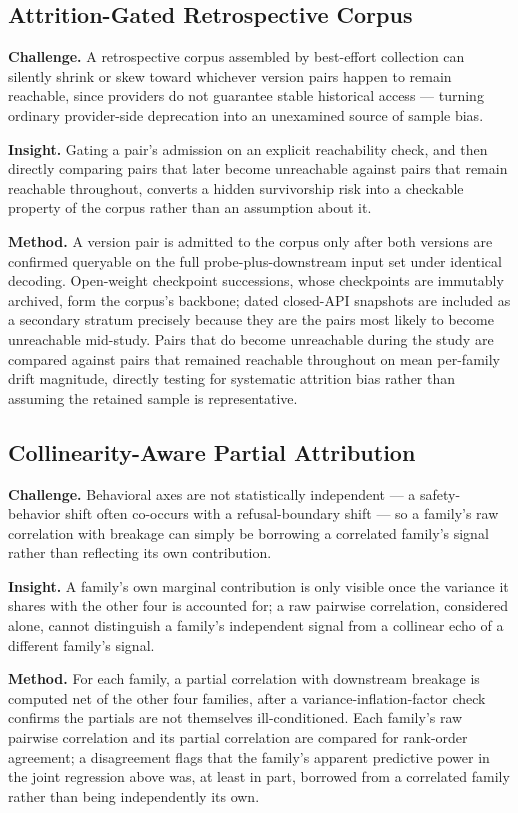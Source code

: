 \documentclass[11pt]{article}
\begin{document}
\subsection{Attrition-Gated Retrospective Corpus}
\textbf{Challenge.} A retrospective corpus assembled by best-effort collection can silently shrink or skew toward whichever version pairs happen to remain reachable, since providers do not guarantee stable historical access --- turning ordinary provider-side deprecation into an unexamined source of sample bias.

\textbf{Insight.} Gating a pair's admission on an explicit reachability check, and then directly comparing pairs that later become unreachable against pairs that remain reachable throughout, converts a hidden survivorship risk into a checkable property of the corpus rather than an assumption about it.

\textbf{Method.} A version pair is admitted to the corpus only after both versions are confirmed queryable on the full probe-plus-downstream input set under identical decoding. Open-weight checkpoint successions, whose checkpoints are immutably archived, form the corpus's backbone; dated closed-API snapshots are included as a secondary stratum precisely because they are the pairs most likely to become unreachable mid-study. Pairs that do become unreachable during the study are compared against pairs that remained reachable throughout on mean per-family drift magnitude, directly testing for systematic attrition bias rather than assuming the retained sample is representative.

\subsection{Collinearity-Aware Partial Attribution}
\textbf{Challenge.} Behavioral axes are not statistically independent --- a safety-behavior shift often co-occurs with a refusal-boundary shift --- so a family's raw correlation with breakage can simply be borrowing a correlated family's signal rather than reflecting its own contribution.

\textbf{Insight.} A family's own marginal contribution is only visible once the variance it shares with the other four is accounted for; a raw pairwise correlation, considered alone, cannot distinguish a family's independent signal from a collinear echo of a different family's signal.

\textbf{Method.} For each family, a partial correlation with downstream breakage is computed net of the other four families, after a variance-inflation-factor check confirms the partials are not themselves ill-conditioned. Each family's raw pairwise correlation and its partial correlation are compared for rank-order agreement; a disagreement flags that the family's apparent predictive power in the joint regression above was, at least in part, borrowed from a correlated family rather than being independently its own.
\end{document}
